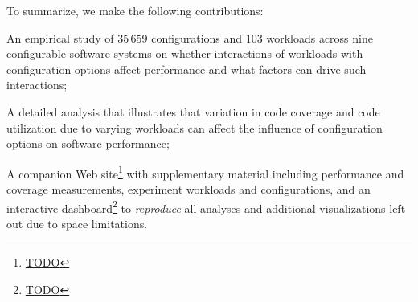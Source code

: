 To summarize, we make the following contributions: 

\begin{compactitem}
	\item An empirical study of {\color{red}35\,659 configurations and 103 workloads across nine} configurable software systems on whether interactions of workloads with configuration options affect performance and what factors can drive such interactions;
	
	\item A detailed analysis that illustrates that variation in code coverage and code utilization due to varying workloads can affect the influence of configuration options on software performance; 
	
	\item A companion Web site\footnote{\color{red}\url{TODO}} with supplementary material including performance and coverage measurements, experiment workloads and configurations, and an interactive dashboard\footnote{\color{red}\url{TODO}} to \textit{reproduce} all analyses and additional visualizations left out due to space limitations.
	
\end{compactitem}


